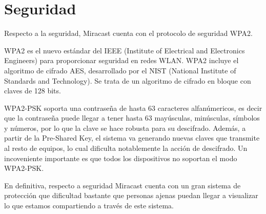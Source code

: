 \section{Seguridad}

Respecto a la seguridad, Miracast cuenta con el protocolo de seguridad WPA2.

WPA2 es el nuevo estándar del IEEE (Institute of Electrical and Electronics Engineers) para proporcionar seguridad en redes WLAN. WPA2 incluye el algoritmo de cifrado AES, desarrollado por el NIST (National Institute of Standards and Technology). Se trata de un algoritmo de cifrado en bloque con claves de 128 bits.

WPA2-PSK soporta una contraseña de hasta 63 caracteres alfanúmericos, es decir que la contraseña puede llegar a tener hasta 63 mayúsculas, minúsculas, símbolos y números, por lo que la clave se hace robusta para su descifrado. Además, a partir de la Pre-Shared Key, el sistema va generando nuevas claves que transmite al resto de equipos, lo cual dificulta notablemente la acción de descifrado. Un incoveniente importante es que todos los dispositivos no soportan el modo WPA2-PSK.

En definitiva, respecto a seguridad Miracast cuenta con un gran sistema de protección que dificultad bastante que personas ajenas puedan llegar a visualizar lo que estamos compartiendo a través de este sistema.

